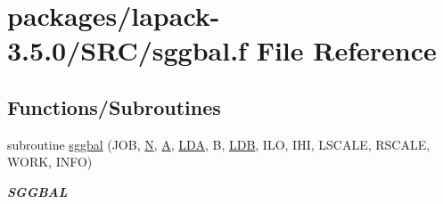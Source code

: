 \hypertarget{sggbal_8f}{}\section{packages/lapack-\/3.5.0/\+S\+R\+C/sggbal.f File Reference}
\label{sggbal_8f}
\subsection*{Functions/\+Subroutines}
\begin{DoxyCompactItemize}
\item 
subroutine \hyperlink{group__realGBcomputational_ga7507b854d792a8dce687e6e876a7ab3f}{sggbal} (J\+O\+B, \hyperlink{polmisc_8c_a0240ac851181b84ac374872dc5434ee4}{N}, \hyperlink{classA}{A}, \hyperlink{example__user_8c_ae946da542ce0db94dced19b2ecefd1aa}{L\+D\+A}, B, \hyperlink{example__user_8c_a50e90a7104df172b5a89a06c47fcca04}{L\+D\+B}, I\+L\+O, I\+H\+I, L\+S\+C\+A\+L\+E, R\+S\+C\+A\+L\+E, W\+O\+R\+K, I\+N\+F\+O)
\begin{DoxyCompactList}\small\item\em {\bfseries S\+G\+G\+B\+A\+L} \end{DoxyCompactList}\end{DoxyCompactItemize}
